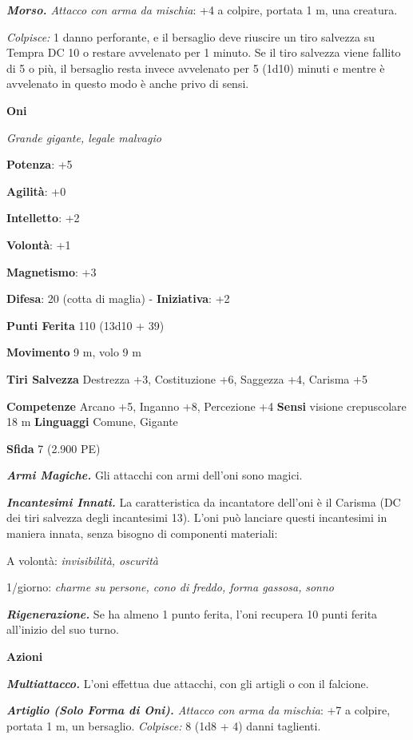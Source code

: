 \begin{multicols}{2}
\emph{\textbf{Morso.} Attacco con arma da mischia}: +4 a colpire,
portata 1 m, una creatura.

\emph{Colpisce:} 1 danno perforante, e il bersaglio deve riuscire un
tiro salvezza su Tempra DC 10 o restare avvelenato per 1 minuto.
Se il tiro salvezza viene fallito di 5 o più, il bersaglio resta invece
avvelenato per 5 (1d10) minuti e mentre è avvelenato in questo modo è
anche privo di sensi.



\textbf{Oni}

\emph{Grande gigante, legale malvagio}

\textbf{Potenza}: +5

\textbf{Agilità}: +0

\textbf{Intelletto}: +2

\textbf{Volontà}: +1

\textbf{Magnetismo}: +3

\textbf{Difesa}: 20 (cotta di maglia) - \textbf{Iniziativa}: +2

\textbf{Punti Ferita} 110 (13d10 + 39)

\textbf{Movimento} 9 m, volo 9 m  

\textbf{Tiri Salvezza} Destrezza +3, Costituzione +6, Saggezza +4,
Carisma +5

\textbf{Competenze} Arcano +5, Inganno +8, Percezione +4 \textbf{Sensi}
visione crepuscolare 18 m \textbf{Linguaggi} Comune,
Gigante

\textbf{Sfida} 7 (2.900 PE)\smallskip

\emph{\textbf{Armi Magiche.}} Gli attacchi con armi dell'oni sono
magici.

\emph{\textbf{Incantesimi Innati.}} La caratteristica da incantatore
dell'oni è il Carisma (DC dei tiri salvezza degli incantesimi 13). L'oni
può lanciare questi incantesimi in maniera innata, senza bisogno di
componenti materiali:

A volontà: \emph{invisibilità, oscurità}

1/giorno: \emph{charme su persone, cono di freddo, forma gassosa,}
\emph{sonno}

\emph{\textbf{Rigenerazione.}} Se ha almeno 1 punto ferita, l'oni
recupera 10 punti ferita all'inizio del suo turno.

\smallskip\textbf{Azioni}

\emph{\textbf{Multiattacco.}} L'oni effettua due attacchi, con gli
artigli o con il falcione.

\emph{\textbf{Artiglio (Solo Forma di Oni).} Attacco con arma da
mischia}: +7 a colpire, portata 1 m, un bersaglio. \emph{Colpisce:} 8
(1d8 + 4) danni taglienti.


\end{multicols}
